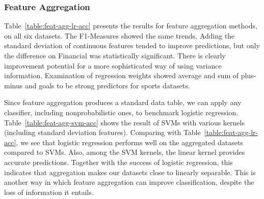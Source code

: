 \documentclass[conference]{IEEEtran}
\begin{document}

\subsubsection{Feature Aggregation}

Table~\ref{table:feat-agg-lr-acc} presents the results for feature aggregation methods, on all six datasets. The F1-Measures showed the same trends. Adding the standard deviation of continuous features tended to improve predictions, but only the difference on Financial was statistically significant. There is clearly improvement potential for a more sophisticated way of using variance information. Examination of regression weights showed average and sum of plus-minus and goals to be strong predictors for sports datasets.

Since feature aggregation produces a standard data table, we can apply any classifier, including nonprobabilistic ones, to benchmark logistic regression. Table~\ref{table:feat-agg-svm-acc} shows the result of SVMs with various kernels (including standard deviation features). Comparing with Table~\ref{table:feat-agg-lr-acc}, we see that logistic regression performs well on the aggregated datasets compared to SVMs. Also, among the SVM kernels, the linear kernel provides accurate predictions. Together with the success of logistic regression, this indicates that aggregation makes our datasets close to linearly separable. This is another way in which feature aggregation can improve classification, despite the loss of information it entails.
\end{document}
